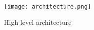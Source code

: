 \begin{figure}
    \centering   
    \texttt{[image: architecture.png]}
    \vspace{-0.2cm}
   \caption{High level architecture}
    \label{fig:structure}
    \vspace{-0.5cm}
\end{figure}

